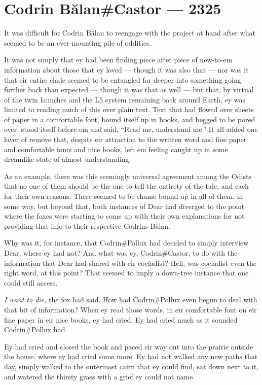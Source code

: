 \hypertarget{codrin-bux103lancastor-2325}{%
\chapter{Codrin Bălan\#Castor — 2325}\label{codrin-bux103lancastor-2325}}

It was difficult for Codrin Bălan to reengage with the project at hand after what seemed to be an ever-mounting pile of oddities.

It was not simply that ey had been finding piece after piece of new-to-em information about those that ey loved — though it was also that — nor was it that eir entire clade seemed to be entangled far deeper into something going further back than expected — though it was that as well — but that, by virtual of the twin launches and the L5 system remaining back around Earth, ey was limited to reading much of this over plain text. Text that had flowed over sheets of paper in a comfortable font, bound itself up in books, and begged to be pored over, stood itself before em and said, ``Read me, understand me.'' It all added one layer of remove that, despite eir attraction to the written word and fine paper and comfortable fonts and nice books, left em feeling caught up in some dreamlike state of almost-understanding.

As an example, there was this seemingly universal agreement among the Odists that no one of them should be the one to tell the entirety of the tale, and each for their own reasons. There seemed to be shame bound up in all of them, in some way, but beyond that, both instances of Dear had diverged to the point where the foxes were starting to come up with their own explanations for not providing that info to their respective Codrins Bălan.

Why was it, for instance, that Codrin\#Pollux had decided to simply interview Dear, where ey had not? And what was ey, Codrin\#Castor, to do with the information that Dear had shared with eir cocladist? Hell, was cocladist even the right word, at this point? That seemed to imply a down-tree instance that one could still access.

\emph{I want to die,} the fox had said. How had Codrin\#Pollux even begun to deal with that bit of information? When ey read those words, in eir comfortable font on eir fine paper in eir nice books, ey had cried. Ey had cried much as it sounded Codrin\#Pollux had.

Ey had cried and closed the book and paced eir way out into the prairie outside the house, where ey had cried some more. Ey had not walked any new paths that day, simply walked to the outermost cairn that ey could find, sat down next to it, and watered the thirsty grass with a grief ey could not name.

